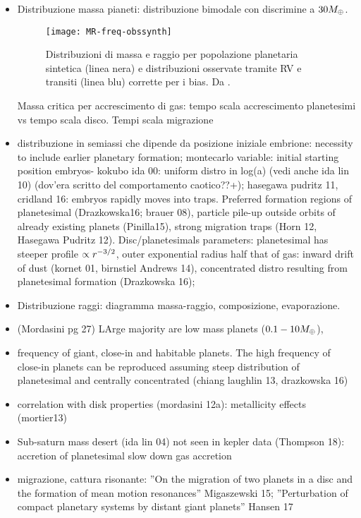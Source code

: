\documentclass[twoside,11pt,fleqn]{memoir}%
\begin{document}
\begin{workout}
\begin{itemize}
\item Distribuzione massa pianeti: distribuzione bimodale con discrimine a $30M_{\oplus}{}$.
\begin{figure}[!ht]\texttt{[image: MR-freq-obssynth]}\caption{Distribuzioni di massa e raggio per popolazione planetaria sintetica (linea nera) e distribuzioni osservate tramite RV e transiti (linea blu) corrette per i bias. Da \cite{mordasini2018planetary}.}\label{fig:MR-freq-obssynth}\end{figure}
Massa critica per accrescimento di gas: tempo scala accrescimento planetesimi vs tempo scala disco.
Tempi scala migrazione
\item distribuzione in semiassi che dipende da posizione iniziale embrione: necessity to include earlier planetary formation; montecarlo variable: initial starting position embryos- kokubo ida 00: uniform distro in log(a) (vedi anche ida lin 10) (dov'era scritto del comportamento caotico??+); hasegawa pudritz 11, cridland 16: embryos rapidly moves into traps.
Preferred formation regions of planetesimal (Drazkowska16; brauer 08), particle pile-up outside orbits of already existing planets (Pinilla15), strong migration traps (Horn 12, Hasegawa Pudritz 12).
Disc/planetesimals parameters: planetesimal has steeper profile $\propto r^{-3/2}$, outer exponential radius half that of gas: inward drift of dust (kornet 01, birnstiel Andrews 14), concentrated distro resulting from planetesimal formation (Drazkowska 16);
\item Distribuzione raggi: diagramma massa-raggio, composizione, evaporazione.
\item (Mordasini pg 27) LArge majority are low mass planets ($0.1-10M_{\oplus}{}$), 
\item frequency of giant, close-in and habitable planets. The high frequency of close-in planets can be reproduced assuming steep distribution of planetesimal and centrally concentrated (chiang laughlin 13, drazkowska 16)
\item correlation with disk properties (mordasini 12a): metallicity effects (mortier13)
\item Sub-saturn mass desert (ida lin 04) not seen in kepler data (Thompson 18): accretion of planetesimal slow down gas accretion
\item migrazione, cattura risonante: ''On the migration of two planets in a disc and the formation of mean motion resonances'' Migaszewski 15; ''Perturbation of compact planetary systems by distant giant planets'' Hansen 17
\end{itemize}
\end{workout}
\end{document}
